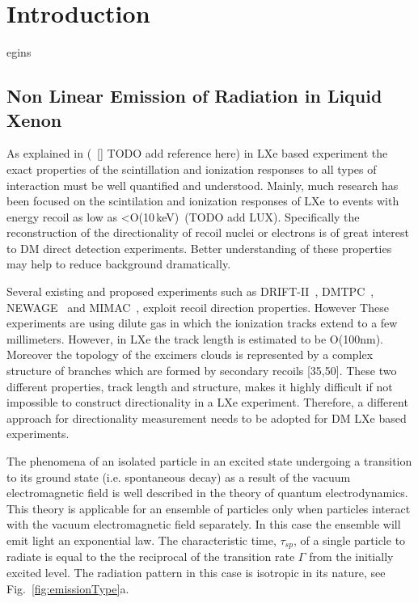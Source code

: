 %
%
\let\textcircled=\pgftextcircled
\chapter{Introduction}
\label{chap:intro}

egins

\section{Non Linear Emission of Radiation in Liquid Xenon}
\label{sec:intro_superradiance}
As explained in (~\ref{} TODO add reference here) in LXe based experiment the exact properties of the scintillation and ionization responses to all types of interaction must be well quantified and understood. Mainly, much research has been focused on the scintilation and ionization responses of LXe to events with energy recoil as low as <O(10\,keV)~\cite{Manzur:2009hp,Aprile:2012an,Baudis:2013cca}(TODO add LUX).
Specifically the reconstruction of the directionality of recoil nuclei or electrons is of great interest to DM direct detection experiments. Better understanding of these properties may help to reduce background dramatically.

Several existing and proposed experiments such as DRIFT-II~\cite{Muna:2007zz}, DMTPC~\cite{Deaconu:2017vam}, NEWAGE~\cite{Yakabe:2016pjh} and MIMAC~\cite{Riffard:2016mgw}, exploit recoil direction properties. However These experiments are using dilute gas in which the ionization tracks extend to a few millimeters. However, in LXe the track length is estimated to be O(100nm). Moreover the topology of the excimers clouds is represented by a complex structure of branches which are formed by secondary recoils [35,50]. These two different properties, track length and structure, makes it highly difficult if not impossible to construct directionality in a LXe experiment. Therefore, a different approach for directionality measurement needs to be adopted for DM LXe based experiments.

The phenomena of an isolated particle in an excited state undergoing a transition to its ground state (i.e. spontaneous decay) as a result of the vacuum electromagnetic field  is well described in the theory of quantum electrodynamics. This theory is applicable for an ensemble of particles only when particles interact with the vacuum electromagnetic field separately. In this case the ensemble will emit light an exponential law. The characteristic time, $\tau_{sp}$, of a single particle to radiate is equal to the the reciprocal of the transition rate $\Gamma$ from the initially excited level. The radiation pattern in this case is isotropic in its nature, see Fig.~\ref{fig:emissionType}a. 


